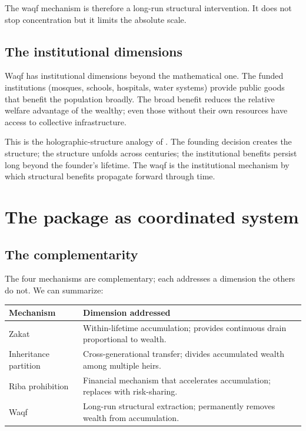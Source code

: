 The waqf mechanism is therefore a long-run structural
intervention. It does not stop concentration but it limits the
absolute scale.

\subsection{The institutional dimensions}

Waqf has institutional dimensions beyond the mathematical one. The
funded institutions (mosques, schools, hospitals, water systems)
provide public goods that benefit the population broadly. The
broad benefit reduces the relative welfare advantage of the
wealthy; even those without their own resources have access to
collective infrastructure.

This is the holographic-structure analogy of .
The founding decision creates the structure; the structure
unfolds across centuries; the institutional benefits persist long
beyond the founder's lifetime. The waqf is the institutional
mechanism by which structural benefits propagate forward through
time.

\section{The package as coordinated system}
\label{sec:perm-package}

\subsection{The complementarity}

The four mechanisms are complementary; each addresses a dimension
the others do not. We can summarize:

\begin{center}
\begin{tabular}{p{} p{}}
\toprule
\textbf{Mechanism} & \textbf{Dimension addressed} \\
\midrule
Zakat & Within-lifetime accumulation; provides continuous drain proportional to wealth. \\
\addlinespace
Inheritance partition & Cross-generational transfer; divides accumulated wealth among multiple heirs. \\
\addlinespace
Riba prohibition & Financial mechanism that accelerates accumulation; replaces with risk-sharing. \\
\addlinespace
Waqf & Long-run structural extraction; permanently removes wealth from accumulation. \\
\bottomrule
\end{tabular}
\end{center}

